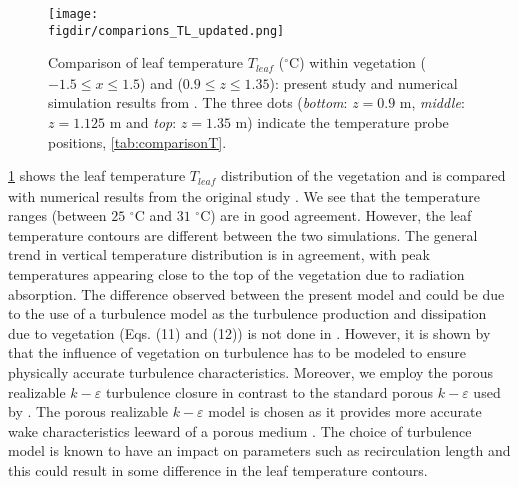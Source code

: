 	\begin{figure}[h]
	\centering
	\texttt{[image: \\figdir/comparions\_TL\_updated.png]}
	\caption{Comparison of leaf temperature $T_\mathit{leaf}$ ($^{\circ}$C) within vegetation ($-1.5\le x \le 1.5$) and ($0.9 \le z \le 1.35$):  present study and  numerical simulation results from \citep{Kichah2012}. The three dots (\textit{bottom}: $z=0.9$ m, \textit{middle}: $z=1.125$ m and \textit{top}: $z=1.35$ m) indicate the temperature probe positions, \cref{tab:comparisonT}.}
	\label{fig:comparions_TL_updated}
	\end{figure}

\cref{fig:comparions_TL_updated} shows the leaf temperature $T_{\mathit{leaf}}$ distribution of the vegetation and is compared with numerical results from the original study \citep{Kichah2012}. We see that the temperature ranges (between $25$ $^{\circ}$C and $31$ $^{\circ}$C) are in good agreement. However, the leaf temperature contours are different between the two simulations. The general trend in vertical temperature distribution is in agreement, with peak temperatures appearing close to the top of the vegetation due to radiation absorption. The difference observed between the present model and \cite{Kichah2012} could be due to the use of a turbulence model as the turbulence production and dissipation due to vegetation (Eqs. (11) and (12)) is not done in \cite{Kichah2012}. However, it is shown by \cite{Sanz2003} that the influence of vegetation on turbulence has to be modeled to ensure physically accurate turbulence characteristics. Moreover, we employ the porous realizable $k-\varepsilon$ turbulence closure in contrast to the standard porous $k-\varepsilon$ used by \cite{Kichah2012}. The porous realizable $k-\varepsilon$ model is chosen as it provides more accurate wake characteristics leeward of a porous medium \citep{Santiago2007, Shih1995}. The choice of turbulence model is known to have an impact on parameters such as recirculation length \citep{Santiago2007} and this could result in some difference in the leaf temperature contours. 


